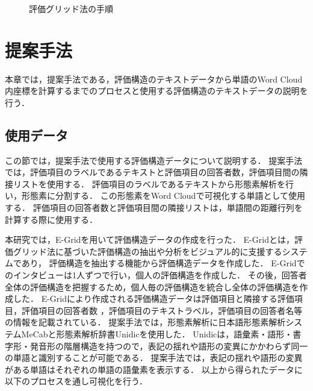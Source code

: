 \documentclass[syuuron]{kuee}
\begin{document}
		\begin{figure}
			\begin{center}
			\end{center}
			\caption{評価グリッド法の手順\cite{egm6}}
	  		\label{fig:egm1}
		\end{figure}

\chapter{提案手法}
	本章では，提案手法である，評価構造のテキストデータから単語のWord Cloud内座標を計算するまでのプロセスと使用する評価構造のテキストデータの説明を行う．
	
	\section{使用データ}
		この節では，提案手法で使用する評価構造データについて説明する．
		提案手法では，評価項目のラベルであるテキストと評価項目の回答者数，評価項目間の隣接リストを使用する．
		評価項目のラベルであるテキストから形態素解析を行い，形態素に分割する．
		この形態素をWord Cloudで可視化する単語として使用する．
		評価項目の回答者数と評価項目間の隣接リストは，単語間の距離行列を計算する際に使用する．
		
		本研究では，E-Gridを用いて評価構造データの作成を行った．
		E-Gridとは，評価グリッド法に基づいた評価構造の抽出や分析をビジュアル的に支援するシステムであり，
		評価構造を抽出する機能から評価構造データを作成した．
		E-Gridでのインタビューは1人ずつで行い，個人の評価構造を作成した．
		その後，回答者全体の評価構造を把握するため，個人毎の評価構造を統合し全体の評価構造を作成した．
		E-Gridにより作成される評価構造データは評価項目と隣接する評価項目，評価項目の回答者数 ，評価項目のテキストラベル，評価項目の回答者名等の情報を記載されている．
		提案手法では，形態素解析に日本語形態素解析システムMeCab\cite{mcb1}と形態素解析辞書Unidicを使用した．
		Unidicは，語彙素・語形・書字形・発音形の階層構造を持つので，表記の揺れや語形の変異にかかわらず同一の単語と識別することが可能である．
		提案手法では，表記の揺れや語形の変異がある単語はそれぞれの単語の語彙素を表示する．
		以上から得られたデータに以下のプロセスを通し可視化を行う．		
		
\end{document}
